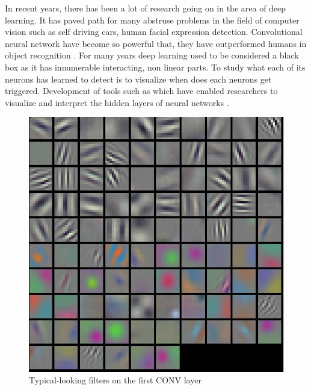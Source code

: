 
\doublespacing
{}
   
In recent years, there has been a lot of research going on in the area of deep learning. It has paved path for many abstruse problems in the field of computer vision such as self driving cars, human facial expression detection\cite{1612.02903}. Convolutional neural network have become so powerful that, they have outperformed humans in  object recognition \cite{CNN-Better,krizhevsky2012imagenet,szegedy2015going,he2016deep,simonyan2014very}.  For many years deep learning used to be considered a black box as it has innumerable interacting, non linear parts. To study what each of its neurons has learned to detect is to visualize when does each neurons get triggered.
Development of tools such as \cite{tensorflow2015-whitepaper} which have enabled researchers to visualize and interpret the hidden layers of neural networks \cite{1506.06579}. 

\begin{figure}[H]
  \centering
    \includegraphics[scale=.3, angle=0]{Files/cnn_visaulize.jpeg}
    \caption[Typical-looking filters on the first CONV layer of a imagenet]{Typical-looking filters on the first CONV layer}
    \label{fig:visualize-cnn}
\end{figure}

